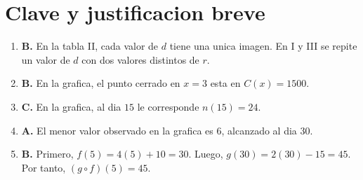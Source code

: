 \documentclass[12pt]{article}
\begin{document}
\section*{Clave y justificacion breve}

\begin{enumerate}[label=\textbf{\arabic*.}]
  \item \textbf{B.} En la tabla II, cada valor de $d$ tiene una unica imagen. En I y III se repite un valor de $d$ con dos valores distintos de $r$.
  \item \textbf{B.} En la grafica, el punto cerrado en $x=3$ esta en $C(x)=1500$.
  \item \textbf{C.} En la grafica, al dia $15$ le corresponde $n(15)=24$.
  \item \textbf{A.} El menor valor observado en la grafica es $6$, alcanzado al dia $30$.
  \item \textbf{B.} Primero, $f(5)=4(5)+10=30$. Luego, $g(30)=2(30)-15=45$. Por tanto, $(g\circ f)(5)=45$.
\end{enumerate}
\end{document}
